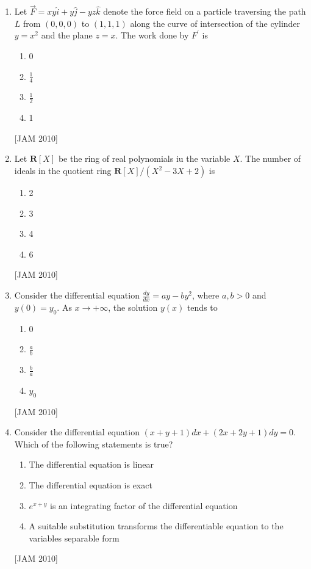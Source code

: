 \begin{enumerate}
\item  Let $\vec{F}=x y \hat{i}+y \hat{j}-y z \hat{k}$ denote the force field on a particle traversing the path $L$ from $(0,0,0)$ to $(1,1,1)$ along the curve of intersection of the cylinder $y=x^{2}$ and the plane $z=x$. The work done by $F^{\prime}$ is 

\begin{enumerate}
    \item 0 
\item $\frac{1}{4}$ 
\item $\frac{1}{2}$ 
\item 1 
\end{enumerate}
\hfill [JAM 2010]



\item  Let $\mathbf{R}[X]$ be the ring of real polynomials iu the variable $X$. The number of ideals in the quotient ring $\mathbf{R}[X] /\left(X^{2}-3 X+2\right)$ is 

\begin{enumerate}
    
\item 2 
\item 3 
\item 4 
\item 6
\end{enumerate}
\hfill [JAM 2010]




\item  Consider the differential equation $\frac{d y}{d x}=a y-b y^{2}$, where $a, b>0$ and $y(0)=y_{0}$. As $x \rightarrow+\infty$, the solution $y(x)$ tends to 

\begin{enumerate}
    \item 0 
\item $\frac{a}{b}$ 
\item $\frac{b}{a}$ 
\item $y_{0}$
\end{enumerate}
\hfill [JAM 2010]





\item  Consider the differential equation $(x+y+1) d x+(2 x+2 y+1) d y=0$. Which of the following statements is true? 

\begin{enumerate}
    
\item The differential equation is linear 
\item The differential equation is exact 
\item $e^{x+y}$ is an integrating factor of the differential equation 
\item A suitable substitution transforms the differentiable equation to the variables separable form
\end{enumerate}
\hfill [JAM 2010]





\end{enumerate}
